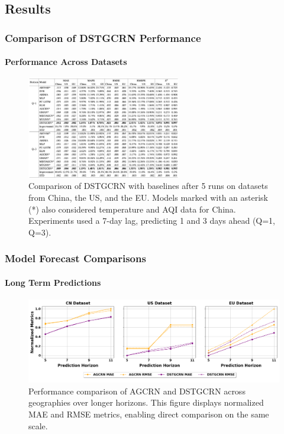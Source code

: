 \documentclass[light]{lutbeamer} %
\begin{document}
\subsection{Results}

\begin{frame}
    \frametitle{Comparison of DSTGCRN Performance}
    \framesubtitle{Performance Across Datasets}
    \begin{figure}
        \centering
        \includegraphics[width=0.6\textwidth]{figures/DSTGCRN_tab_results.png}
        \caption{Comparison of DSTGCRN with baselines after 5 runs on datasets from China, the US, and the EU. Models marked with an asterisk (*) also considered temperature and AQI data for China. Experiments used a 7-day lag, predicting 1 and 3 days ahead (Q=1, Q=3).}
    \end{figure}
\end{frame}



\begin{frame}
    \frametitle{Model Forecast Comparisons}
    \framesubtitle{Long Term Predictions}

    \begin{figure}
        \centering
        \includegraphics[width=\textwidth]{figures/longer_horizon.png}
        \caption{Performance comparison of AGCRN and DSTGCRN across geographies over longer horizons. This figure displays normalized MAE and RMSE metrics, enabling direct comparison on the same scale.}
    \end{figure}

\end{frame}
\end{document}

